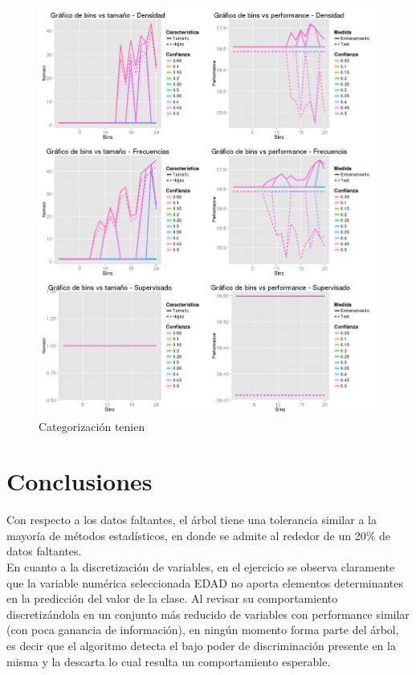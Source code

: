 \documentclass[]{article}
\begin{document}
\begin{figure}[H]
	\includegraphics[scale = 0.4]{4_2_Bins_Selected_var}
	\caption[Ruido]{Categorización tenien}
	\label{4.P4Selected}
\end{figure}




\section*{Conclusiones}
Con respecto a los datos faltantes, el árbol tiene una tolerancia similar a la mayoría de métodos estadísticos, en donde se admite al rededor de un 20\% de datos faltantes. \\
En cuanto a la discretización de variables, en el ejercicio se observa claramente que la variable numérica seleccionada EDAD no aporta elementos determinantes en la predicción del valor de la clase. Al revisar su comportamiento discretizándola en un conjunto más reducido de variables con performance similar (con poca ganancia de información), en ningún momento forma parte del árbol, es decir que el algoritmo detecta el bajo poder de discriminación presente en la misma y la descarta lo cual resulta un comportamiento esperable.
\end{document}
